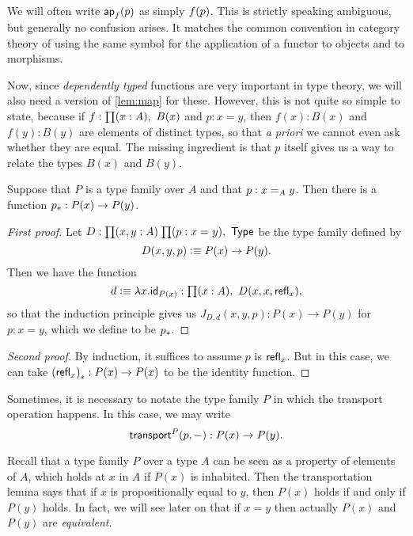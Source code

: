 We will often write $\apfunc f (p)$ as simply $\ap f p$.
This is strictly speaking ambiguous, but generally no confusion arises.
It matches the common convention in category theory of using the same symbol for the application of a functor to objects and to morphisms.

Now, since \emph{dependently typed} functions are very important in type theory, we will also need a version of \autoref{lem:map} for these.
However, this is not quite so simple to state, because if $f:\prd{x:A} B(x)$ and $p:x=y$, then $f(x):B(x)$ and $f(y):B(y)$ are elements of distinct types, so that \emph{a priori} we cannot even ask whether they are equal.
The missing ingredient is that $p$ itself gives us a way to relate the types $B(x)$ and $B(y)$.

\begin{lem}[Transport]\label{lem:transport}
  Suppose that $P$ is a type family over $A$ and that $p:\id[A]xy$.
  Then there is a function $\transf{p}:P(x)\to P(y)$.
\end{lem}

\begin{proof}[First proof]
  Let $D:\prd{x,y:A}{p:\id{x}{y}} \type$ be the type family defined by
  \[D(x,y,p)\defeq P(x)\to P(y).\]
  Then we have the function
  \begin{equation*}
    d\defeq\lambda x.\idfunc[P(x)]:\prd{x:A} D(x,x,\refl{x}),
  \end{equation*}
  so that the induction principle gives us $J_{D,d}(x,y,p):P(x)\to P(y)$ for $p:x= y$, which we define to be $\transf p$.
\end{proof}

\begin{proof}[Second proof]
  By induction, it suffices to assume $p$ is $\refl x$.
  But in this case, we can take $\transf{(\refl x)}:P(x)\to P(x)$ to be the identity function.
\end{proof}

Sometimes, it is necessary to notate the type family $P$ in which the transport operation happens.
In this case, we may write
\[\transfib P p - : P(x) \to P(y).\]

Recall that a type family $P$ over a type $A$ can be seen as a property of elements of $A$, which holds at $x$ in $A$ if $P(x)$ is inhabited.
Then the transportation lemma says that if $x$ is propositionally equal to $y$, then $P(x)$ holds if and only if $P(y)$ holds.
In fact, we will see later on that if $x=y$ then actually $P(x)$ and $P(y)$ are \emph{equivalent}.

